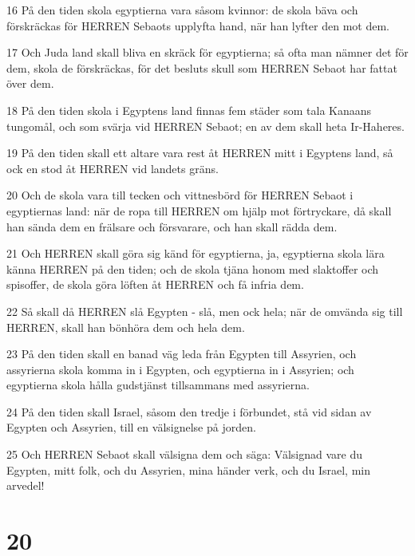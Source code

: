 \par 16 På den tiden skola egyptierna vara såsom kvinnor: de skola bäva och förskräckas för HERREN Sebaots upplyfta hand, när han lyfter den mot dem.
\par 17 Och Juda land skall bliva en skräck för egyptierna; så ofta man nämner det för dem, skola de förskräckas, för det besluts skull som HERREN Sebaot har fattat över dem.
\par 18 På den tiden skola i Egyptens land finnas fem städer som tala Kanaans tungomål, och som svärja vid HERREN Sebaot; en av dem skall heta Ir-Haheres.
\par 19 På den tiden skall ett altare vara rest åt HERREN mitt i Egyptens land, så ock en stod åt HERREN vid landets gräns.
\par 20 Och de skola vara till tecken och vittnesbörd för HERREN Sebaot i egyptiernas land: när de ropa till HERREN om hjälp mot förtryckare, då skall han sända dem en frälsare och försvarare, och han skall rädda dem.
\par 21 Och HERREN skall göra sig känd för egyptierna, ja, egyptierna skola lära känna HERREN på den tiden; och de skola tjäna honom med slaktoffer och spisoffer, de skola göra löften åt HERREN och få infria dem.
\par 22 Så skall då HERREN slå Egypten - slå, men ock hela; när de omvända sig till HERREN, skall han bönhöra dem och hela dem.
\par 23 På den tiden skall en banad väg leda från Egypten till Assyrien, och assyrierna skola komma in i Egypten, och egyptierna in i Assyrien; och egyptierna skola hålla gudstjänst tillsammans med assyrierna.
\par 24 På den tiden skall Israel, såsom den tredje i förbundet, stå vid sidan av Egypten och Assyrien, till en välsignelse på jorden.
\par 25 Och HERREN Sebaot skall välsigna dem och säga: Välsignad vare du Egypten, mitt folk, och du Assyrien, mina händer verk, och du Israel, min arvedel!

\chapter{20}

